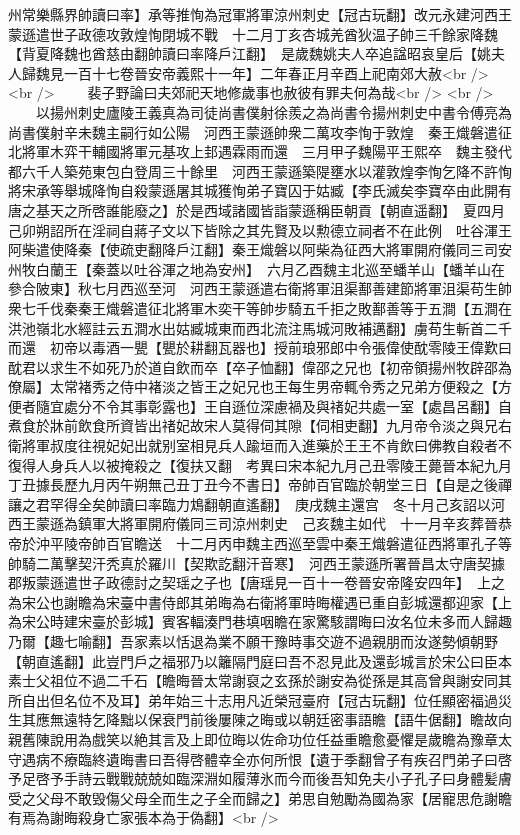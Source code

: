 州常樂縣界帥讀曰率】承等推恂為冠軍將軍涼州刺史【冠古玩翻】改元永建河西王蒙遜遣世子政德攻敦煌恂閉城不戰　十二月丁亥杏城羌酋狄温子帥三千餘家降魏【背夏降魏也酋慈由翻帥讀曰率降戶江翻】　是歲魏姚夫人卒追諡昭哀皇后【姚夫人歸魏見一百十七卷晉安帝義熙十一年】二年春正月辛酉上祀南郊大赦<br />
<br />
　　裴子野論曰夫郊祀天地修歲事也赦彼有罪夫何為哉<br />
<br />
　　以揚州刺史廬陵王義真為司徒尚書僕射徐羨之為尚書令揚州刺史中書令傅亮為尚書僕射辛未魏主嗣行如公陽　河西王蒙遜帥衆二萬攻李恂于敦煌　秦王熾磐遣征北將軍木弈干輔國將軍元基攻上邽遇霖雨而還　三月甲子魏陽平王熙卒　魏主發代都六千人築苑東包白登周三十餘里　河西王蒙遜築隄壅水以灌敦煌李恂乞降不許恂將宋承等舉城降恂自殺蒙遜屠其城獲恂弟子寶囚于姑臧【李氏滅矣李寶卒由此開有唐之基天之所啓誰能廢之】於是西域諸國皆詣蒙遜稱臣朝貢【朝直遥翻】　夏四月己卯朔詔所在淫祠自蔣子文以下皆除之其先賢及以勲德立祠者不在此例　吐谷渾王阿柴遣使降秦【使疏吏翻降戶江翻】秦王熾磐以阿柴為征西大將軍開府儀同三司安州牧白蘭王【秦蓋以吐谷渾之地為安州】　六月乙酉魏主北巡至蟠羊山【蟠羊山在參合陂東】秋七月西巡至河　河西王蒙遜遣右衛將軍沮渠鄯善建節將軍沮渠苟生帥衆七千伐秦秦王熾磐遣征北將軍木奕干等帥步騎五千拒之敗鄯善等于五澗【五澗在洪池嶺北水經註云五澗水出姑臧城東而西北流注馬城河敗補邁翻】虜苟生斬首二千而還　初帝以毒酒一甖【甖於耕翻瓦器也】授前琅邪郎中令張偉使酖零陵王偉歎曰酖君以求生不如死乃於道自飲而卒【卒子恤翻】偉邵之兄也【初帝領揚州牧辟邵為僚屬】太常褚秀之侍中褚淡之皆王之妃兄也王每生男帝輒令秀之兄弟方便殺之【方便者隨宜處分不令其事彰露也】王自遜位深慮禍及與禇妃共處一室【處昌呂翻】自煮食於牀前飲食所資皆出禇妃故宋人莫得伺其隙【伺相吏翻】九月帝令淡之與兄右衛將軍叔度往視妃妃出就别室相見兵人踰垣而入進藥於王王不肯飲曰佛教自殺者不復得人身兵人以被掩殺之【復扶又翻　考異曰宋本紀九月己丑零陵王薨晉本紀九月丁丑據長歷九月丙午朔無己丑丁丑今不書日】帝帥百官臨於朝堂三日【自是之後禪讓之君罕得全矣帥讀曰率臨力鴆翻朝直遙翻】　庚戌魏主還宫　冬十月己亥詔以河西王蒙遜為鎮軍大將軍開府儀同三司涼州刺史　己亥魏主如代　十一月辛亥葬晉恭帝於沖平陵帝帥百官瞻送　十二月丙申魏主西巡至雲中秦王熾磐遣征西將軍孔子等帥騎二萬擊契汗秃真於羅川【契欺訖翻汗音寒】　河西王蒙遜所署晉昌太守唐契據郡叛蒙遜遣世子政德討之契瑶之子也【唐瑶見一百十一卷晉安帝隆安四年】　上之為宋公也謝瞻為宋臺中書侍郎其弟晦為右衛將軍時晦權遇已重自彭城還都迎家【上為宋公時建宋臺於彭城】賓客輻湊門巷填咽瞻在家驚駭謂晦曰汝名位未多而人歸趣乃爾【趣七喻翻】吾家素以恬退為業不願干豫時事交遊不過親朋而汝遂勢傾朝野【朝直遙翻】此豈門戶之福邪乃以籬隔門庭曰吾不忍見此及還彭城言於宋公曰臣本素士父祖位不過二千石【瞻晦晉太常謝裒之玄孫於謝安為從孫是其高曾與謝安同其所自出但名位不及耳】弟年始三十志用凡近榮冠臺府【冠古玩翻】位任顯密福過災生其應無遠特乞降黜以保衰門前後屢陳之晦或以朝廷密事語瞻【語牛倨翻】瞻故向親舊陳說用為戲笑以絶其言及上即位晦以佐命功位任益重瞻愈憂懼是歲瞻為豫章太守遇病不療臨終遺晦書曰吾得啓體幸全亦何所恨【遺于季翻曾子有疾召門弟子曰啓予足啓予手詩云戰戰兢兢如臨深淵如履薄氷而今而後吾知免夫小子孔子曰身體髪膚受之父母不敢毁傷父母全而生之子全而歸之】弟思自勉勵為國為家【居寵思危謝瞻有焉為謝晦殺身亡家張本為于偽翻】<br />
